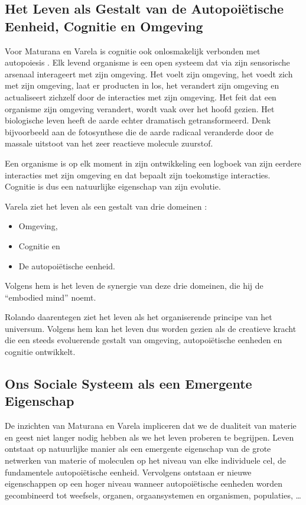 \documentclass[
  11pt,
]{book}
\providecommand{\tightlist}{%
  \setlength{\itemsep}{0pt}\setlength{\parskip}{0pt}}
\begin{document}
\subsection{Het Leven als Gestalt van de Autopoiëtische Eenheid, Cognitie en Omgeving}\label{leven-als-gestalt}

Voor Maturana en Varela is cognitie ook onlosmakelijk verbonden met autopoiesis \citep{capraLuisi2014}. Elk levend organisme is een open systeem dat via zijn sensorische arsenaal interageert met zijn omgeving. Het voelt zijn omgeving, het voedt zich met zijn omgeving, laat er producten in los, het verandert zijn omgeving en actualiseert zichzelf door de interacties met zijn omgeving. Het feit dat een organisme zijn omgeving verandert, wordt vaak over het hoofd gezien. Het biologische leven heeft de aarde echter dramatisch getransformeerd. Denk bijvoorbeeld aan de fotosynthese die de aarde radicaal veranderde door de massale uitstoot van het zeer reactieve molecule zuurstof.

Een organisme is op elk moment in zijn ontwikkeling een logboek van zijn eerdere interacties met zijn omgeving en dat bepaalt zijn toekomstige interacties. Cognitie is dus een natuurlijke eigenschap van zijn evolutie.

Varela ziet het leven als een gestalt van drie domeinen \citep{capraLuisi2014}:

\begin{itemize}
\tightlist
\item
  Omgeving,
\item
  Cognitie en
\item
  De autopoiëtische eenheid.
\end{itemize}

Volgens hem is het leven de synergie van deze drie domeinen, die hij de ``embodied mind'' noemt.

Rolando daarentegen ziet het leven als het organiserende principe van het universum. Volgens hem kan het leven dus worden gezien als de creatieve kracht die een steeds evoluerende gestalt van omgeving, autopoiëtische eenheden en cognitie ontwikkelt.

\subsection{Ons Sociale Systeem als een Emergente Eigenschap}\label{ons-sociale-systeem-als-een-emergente-eigenschap}

De inzichten van Maturana en Varela impliceren dat we de dualiteit van materie en geest niet langer nodig hebben als we het leven proberen te begrijpen. Leven ontstaat op natuurlijke manier als een emergente eigenschap van de grote netwerken van materie of moleculen op het niveau van elke individuele cel, de fundamentele autopoiëtische eenheid. Vervolgens ontstaan er nieuwe eigenschappen op een hoger niveau wanneer autopoiëtische eenheden worden gecombineerd tot weefsels, organen, orgaansystemen en organismen, populaties, \ldots{}
\end{document}
